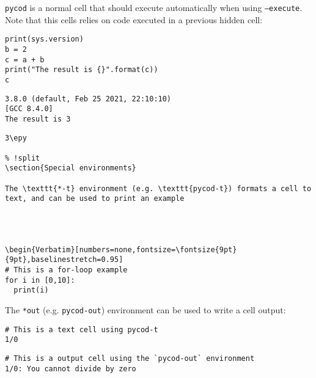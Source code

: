 \documentclass[%
oneside,                 %
final,                   %
chapterprefix=true,      %
open=right,              %
10pt]{book}
\begin{document}
\texttt{pycod} is a normal cell that should execute automatically when using \texttt{--execute}. Note that this cells relies on code executed in a previous hidden cell:






\begin{Verbatim}[numbers=none,fontsize=\fontsize{9pt}{9pt},baselinestretch=0.95]
print(sys.version)
b = 2
c = a + b
print("The result is {}".format(c))
c

\end{Verbatim}

\begin{Verbatim}[numbers=none,fontsize=\fontsize{9pt}{9pt},baselinestretch=0.95]
3.8.0 (default, Feb 25 2021, 22:10:10) 
[GCC 8.4.0]
The result is 3
\end{Verbatim}
\begin{Verbatim}[numbers=none,fontsize=\fontsize{9pt}{9pt},baselinestretch=0.95]
3\epy

% !split
\section{Special environments}

The \texttt{*-t} environment (e.g. \texttt{pycod-t}) formats a cell to text, and can be used to print an example




\begin{Verbatim}[numbers=none,fontsize=\fontsize{9pt}{9pt},baselinestretch=0.95]
# This is a for-loop example
for i in [0,10]:
  print(i)

\end{Verbatim}


The \texttt{*out}  (e.g. \texttt{pycod-out}) environment can be used to write a cell output:



\begin{Verbatim}[numbers=none,fontsize=\fontsize{9pt}{9pt},baselinestretch=0.95]
# This is a text cell using pycod-t
1/0

\end{Verbatim}




\begin{Verbatim}[numbers=none,fontsize=\fontsize{9pt}{9pt},baselinestretch=0.95]
# This is a output cell using the `pycod-out` environment
1/0: You cannot divide by zero

\end{Verbatim}
\end{document}
